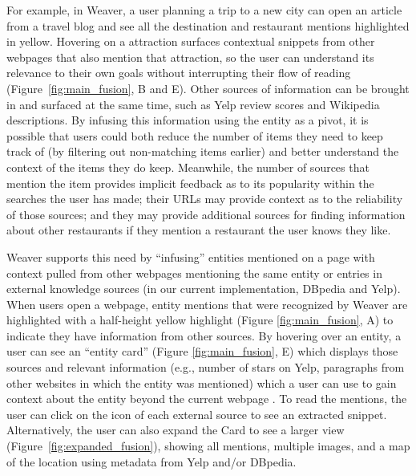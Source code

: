 For example, in Weaver, a user planning a trip to a new city can open an article from a travel blog and see all the destination and restaurant mentions highlighted in yellow. Hovering on a attraction surfaces contextual snippets from other webpages that also mention that attraction, so the user can understand its relevance to their own goals without interrupting their flow of reading (Figure~\ref{fig:main_fusion}, B and E). Other sources of information can be brought in and surfaced at the same time, such as Yelp review scores and Wikipedia descriptions. By infusing this information using the entity as a pivot, it is possible that users could both reduce the number of items they need to keep track of (by filtering out non-matching items earlier) and better understand the context of the items they do keep. Meanwhile, the number of sources that mention the item provides implicit feedback as to its popularity within the searches the user has made; their URLs may provide context as to the reliability of those sources; and they may provide additional sources for finding information about other restaurants if they mention a restaurant the user knows they like. 

Weaver supports this need by ``infusing'' entities mentioned on a page with context pulled from other webpages mentioning the same entity or entries in external knowledge sources (in our current implementation, DBpedia and Yelp). When users open a webpage, entity mentions that were recognized by Weaver are highlighted with a half-height yellow highlight (Figure \ref{fig:main_fusion}, A) to indicate they have information from other sources. By hovering over an entity, a user can see an ``entity card'' (Figure \ref{fig:main_fusion}, E) which displays those sources and relevant information (e.g., number of stars on Yelp, paragraphs from other websites in which the entity was mentioned) which a user can use to gain context about the entity beyond the current webpage \cite{bota}. To read the mentions, the user can click on the icon of each external source to see an extracted snippet. Alternatively, the user can also expand the Card to see a larger view (Figure~\ref{fig:expanded_fusion}), showing all mentions, multiple images, and a map of the location using metadata from Yelp and/or DBpedia. 

